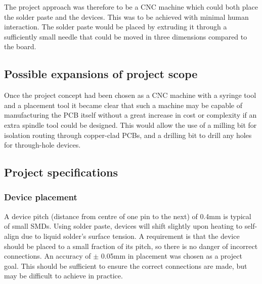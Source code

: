 
The project approach was therefore to be a CNC machine which could both place the 
solder paste and the devices. This was to be achieved with minimal human
interaction. The solder paste would be placed by extruding it through
a sufficiently small needle that could be moved in three dimensions
compared to the board.


\subsection{Possible expansions of project scope}
Once the project concept had been chosen as a CNC machine with a syringe
tool and a placement tool it became clear that such a machine may be 
capable of manufacturing the PCB itself without a great increase in cost
or complexity if an extra spindle tool could be designed. This would
allow the use of a milling bit for isolation routing through copper-clad
PCBs, and a drilling bit to drill any holes for through-hole devices.

\subsection{Project specifications}



\subsubsection{Device placement}
\label{devplacement}
A device pitch (distance from centre of one pin to the next) of 0.4mm is typical of small SMDs. Using solder paste,
devices will shift slightly upon heating to self-align due to liquid solder's surface tension. A requirement is that the device should be placed to a
small fraction of its pitch, so there is no danger of incorrect connections. An accuracy of $\pm$ 0.05mm
in placement was chosen as a project goal. This should be sufficient to ensure the correct connections are made, but may be difficult to achieve in practice.

